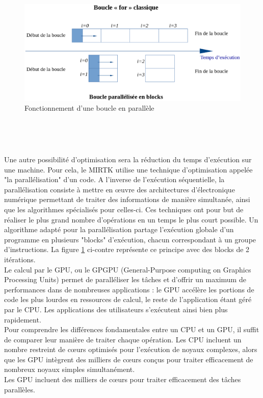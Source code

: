\documentclass[10pt]{report}
\begin{document}
	\begin{figure}[h!]
		\begin{center}
			\includegraphics[width=14cm]{Reports/figures/gfor.eps}	
		\end{center}
		\caption{Fonctionnement d'une boucle en parallèle}
		\label{Fonctionnement d'une boucle en parallèle}
	\end{figure}
	~\par~\par
	Une autre possibilité d'optimisation sera la réduction du temps d'exécution sur une machine. Pour cela, le MIRTK utilise une technique d'optimisation appelée "la parallélisation" d'un code. 
	A l'inverse de l'exécution séquentielle, la parallélisation consiste à mettre en œuvre des architectures d'électronique numérique permettant de traiter des informations de manière simultanée, ainsi que les algorithmes spécialisés pour celles-ci. Ces techniques ont pour but de réaliser le plus grand nombre d'opérations en un temps le plus court possible.
	Un algorithme adapté pour la parallélisation partage l'exécution globale d'un programme en plusieurs "blocks" d'exécution, chacun correspondant à un groupe d'instructions. La figure \ref{Fonctionnement d'une boucle en parallèle} ci-contre représente ce principe avec des blocks de 2 itérations.\\

	
	Le calcul par le GPU, ou le GPGPU (General-Purpose computing on Graphics Processing Units) permet de paralléliser les tâches et d'offrir un maximum de performances dans de nombreuses applications : le GPU accélère les portions de code les plus lourdes en ressources de calcul, le reste de l'application étant géré par le CPU. Les applications des utilisateurs s'exécutent ainsi bien plus rapidement.\\
	Pour comprendre les différences fondamentales entre un CPU et un GPU, il suffit de comparer leur manière de traiter chaque opération. Les CPU incluent un nombre restreint de cœurs optimisés pour l'exécution de noyaux complexes, alors que les GPU intègrent des milliers de cœurs conçus pour traiter efficacement de nombreux noyaux simples simultanément.\\
	Les GPU incluent des milliers de cœurs pour traiter efficacement des tâches parallèles. \\ 
	 
\end{document}

